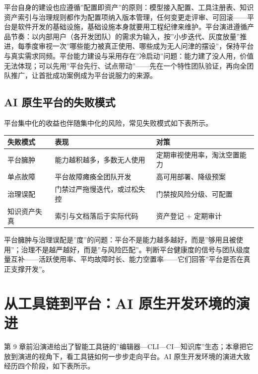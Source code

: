 \documentclass[12pt,a4paper,twoside,openany]{ctexbook}
\numberwithin{figure}{chapter}
\numberwithin{table}{chapter}
\newcounter{none}
\begin{document}
平台自身的建设也应遵循''配置即资产''的原则：模型接入配置、工具注册表、知识资产索引与治理规则都作为配置项纳入版本管理，任何变更走评审、可回滚------平台是软件开发的基础设施，基础设施本身就要用工程纪律来维护。平台演进遵循产品节奏：以内部用户（各开发团队）的需求为输入，按''小步迭代、灰度放量''推进，每季度审视一次''哪些能力被真正使用、哪些成为无人问津的摆设''，保持平台与真实需求同频。平台能力建设与采用存在''冷启动''问题：能力建了没人用，价值无法体现；可以先用''平台先行、试点带动''------先在一个特性团队验证，再向全团队推广，让首批成功案例成为平台说服力的来源。

\subsection{AI
原生平台的失败模式}\label{ai-ux539fux751fux5e73ux53f0ux7684ux5931ux8d25ux6a21ux5f0f}

平台集中化的收益也伴随集中化的风险，常见失败模式如下表所示。

{\def\LTcaptype{none} %
\begin{longtable}[]{@{}lll@{}}
\toprule\noalign{}
失败模式 & 表现 & 对策 \\
\midrule\noalign{}
\endhead
\bottomrule\noalign{}
\endlastfoot
平台臃肿 & 能力越积越多，多数无人使用 & 定期审视使用率，淘汰空置能力 \\
单点故障 & 平台故障瘫痪全团队开发 & 高可用部署、降级预案 \\
治理误配 & 门禁过严拖慢迭代，或过松失控 & 门禁按风险分级、可配置 \\
知识资产失真 & 索引与文档落后于实际代码 & 资产登记 + 定期审计 \\
\end{longtable}
}

平台臃肿与治理误配是''度''的问题：平台不是能力越多越好，而是''够用且被使用''；治理不是越严越好，而是''与风险匹配''。判断平台健康度的信号与团队级度量互补------活跃使用率、平均故障时长、能力空置率------它们回答''平台是否在真正支撑开发''。

\section{从工具链到平台：AI
原生开发环境的演进}\label{ux4eceux5de5ux5177ux94feux5230ux5e73ux53f0ai-ux539fux751fux5f00ux53d1ux73afux5883ux7684ux6f14ux8fdb}

第 9
章前沿演进给出了智能工具链的''编辑器---CLI---CI---知识库''生态；本章把它放到演进的视角下，看工具链如何一步步走向平台。AI
原生开发环境的演进大致经历四个阶段，如下表所示。
\end{document}

